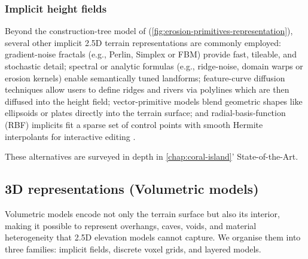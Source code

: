 \subsubsection{Implicit height fields}

Beyond the construction-tree model of \cite{Genevaux2015} (\cref{fig:erosion-primitives-representation}), several other implicit 2.5D terrain representations are commonly employed: gradient-noise fractals (e.g., Perlin, Simplex or FBM) provide fast, tileable, and stochastic detail; spectral or analytic formulas (e.g., ridge-noise, domain warps or erosion kernels) enable semantically tuned landforms; feature-curve diffusion techniques allow users to define ridges and rivers via polylines which are then diffused into the height field; vector-primitive models blend geometric shapes like ellipsoids or plates directly into the terrain surface; and radial-basis-function (RBF) implicits fit a sparse set of control points with smooth Hermite interpolants for interactive editing .

These alternatives are surveyed in depth in \cref{chap:coral-island}' State-of-the-Art.

\subsection{3D representations (Volumetric models)}
Volumetric models encode not only the terrain surface but also its interior, making it possible to represent overhangs, caves, voids, and material heterogeneity that 2.5D elevation models cannot capture.
We organise them into three families: implicit fields, discrete voxel grids, and layered models.

